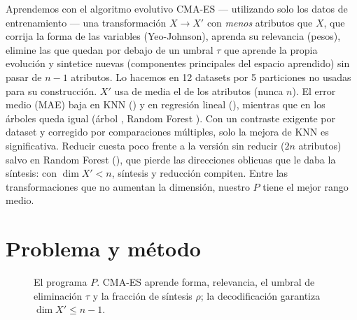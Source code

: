 \documentclass[apuntes,doscolumnas]{uc3mmaster}
\begin{document}
\makeportada

\begin{resultado}[Resumen]

Aprendemos con el algoritmo evolutivo CMA-ES --- utilizando solo los datos de entrenamiento --- una transformación $X\to X'$ con \textit{menos} atributos que $X$, que corrija la forma de las variables (Yeo-Johnson), aprenda su relevancia (pesos), elimine las que quedan por debajo de un umbral $\tau$ que aprende la propia evolución y sintetice nuevas (componentes principales del espacio aprendido) sin pasar de $n-1$ atributos. Lo hacemos en 12 datasets por 5 particiones no usadas para su construcción. $X'$ usa de media el \dimMedia{} de los atributos (nunca $n$). El error medio (MAE) baja en KNN (\cambioKNN) y en regresión lineal (\cambioRL), mientras que en los árboles queda igual (árbol \cambioArbol, Random Forest \cambioRF). Con un contraste exigente por dataset y corregido por comparaciones múltiples, solo la mejora de KNN es significativa. Reducir cuesta poco frente a la versión sin reducir ($2n$ atributos) salvo en Random Forest (\cambioRedRF), que pierde las direcciones oblicuas que le daba la síntesis: con $\dim X'<n$, síntesis y reducción compiten. Entre las transformaciones que no aumentan la dimensión, nuestro $P$ tiene el mejor rango medio.

\end{resultado}

\section{Problema y método}


\begin{figure}[htbp]
\centering{}

\caption{El programa $P$. CMA-ES aprende forma, relevancia, el umbral de eliminación $\tau$ y la fracción de síntesis
$\rho$; la decodificación garantiza $\dim X'\le n-1$.}
\label{fig:esquema}
\end{figure}
\end{document}
